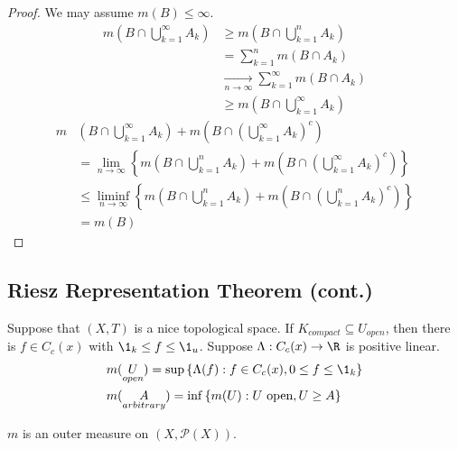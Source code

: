 \begin{proof}
	We may assume $m(B) \leq \infty$.
	\begin{align*}
	  m \left(B \cap \bigcup_{k = 1}^{\infty} A_k \right) & \geq m \left(B \cap \bigcup_{k = 1}^{n} A_k \right) \\
		& = \sum_{k = 1}^{n} m(B \cap A_k) \tag{Step 3$'$} \\
		& \xrightarrow[n \to \infty]{} \sum_{k = 1}^{\infty} m(B \cap A_k) \\
		& \geq m \left( B \cap \bigcup_{k = 1}^{\infty} A_k \right)
	\end{align*}
	\begin{align*}
	  m & \left(B \cap \bigcup_{k = 1}^{\infty} A_k \right) + m \left(B \cap \left( \bigcup_{k = 1}^{\infty} A_k\right)^{c}\right) \\
		& = \lim_{n \to \infty} \left\{ m \left( B \cap \bigcup_{k = 1}^{n} A_k \right) + m \left(B \cap \left(\bigcup_{k = 1}^{\infty} A_k\right)^{c}\right)\right\} \\
		& \leq \liminf_{n \to \infty} \left\{ m \left(B \cap \bigcup_{k = 1}^{n} A_k\right) + m \left(B \cap \left(\bigcup_{k = 1}^{n} A_k\right)^{c}\right)\right\} \\
		& = m(B)
	\end{align*}
\end{proof}

\subsection{Riesz Representation Theorem (cont.)}

Suppose that $(X,T)$ is a  nice topological space.
If $K_{compact} \subseteq U_{open}$, then there is $f \in C_c(x)$ with $\1_k \leq f \leq \1_u$.
Suppose $\Lambda : C_c(x) \to \R$ is positive linear.
\begin{align*}
  & m(\underset{open}{U}) = \sup \left\{\Lambda(f) : f \in C_c(x), 0 \leq f \leq \1_k \right\} \\
  & m(\underset{arbitrary}{A}) = \inf \left\{ m(U): U \textrm{ open}, U \geq A\right\} \\
\end{align*}

\begin{lemma}
  $m$ is an outer measure on $(X, \mathcal{P}(X))$.
\end{lemma}

